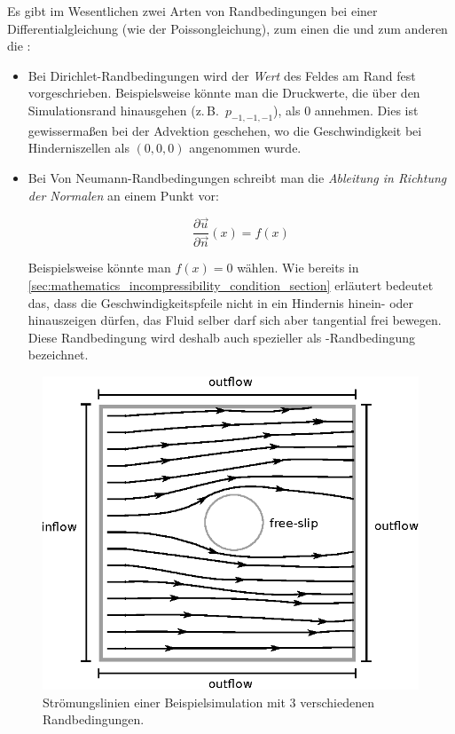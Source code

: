 Es gibt im Wesentlichen zwei Arten von Randbedingungen bei einer
Differentialgleichung (wie der Poissongleichung), zum einen die
 und zum anderen die
:

\begin{itemize}
\item
	Bei Dirichlet-Randbedingungen wird der \emph{Wert} des Feldes am Rand
	fest vorgeschrieben. Beispielsweise könnte man die Druckwerte, die über
	den Simulationsrand hinausgehen (z.\,B.\ $p_{-1,-1,-1}$), als $0$ annehmen.
	Dies ist gewissermaßen bei der Advektion geschehen, wo die
	Geschwindigkeit bei Hinderniszellen als $(0,0,0)$ angenommen wurde.
\item
	Bei Von Neumann-Randbedingungen schreibt man die \emph{Ableitung in
	Richtung der Normalen} an einem Punkt vor:

	\begin{equation}
	\frac{
		\partial \vec{u}
	}
	{
		\partial \vec{n}
	}(x)
	=
	f(x)
	\end{equation}

	Beispielsweise könnte man $f(x)=0$ wählen. Wie bereits in
	\cref{sec:mathematics_incompressibility_condition_section} erläutert
	bedeutet das, dass die Geschwindigkeitspfeile nicht in ein Hindernis
	hinein- oder hinauszeigen dürfen, das Fluid selber darf sich aber tangential
	frei bewegen. Diese Randbedingung wird deshalb auch spezieller als
	-Randbedingung bezeichnet.
\end{itemize}

\begin{figure}[ht]
\centering
\includegraphics[width=12cm]{images/boundary_types}
\caption{Strömungslinien einer Beispielsimulation mit 3 verschiedenen Randbedingungen.}
\label{fig:stam_boundary_types}
\end{figure}

